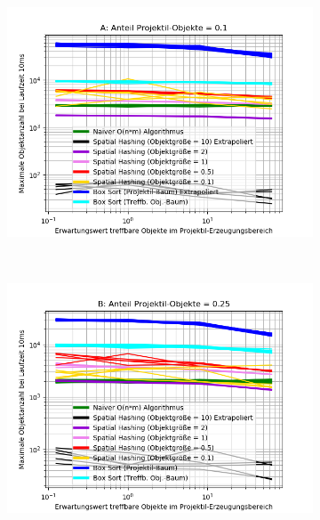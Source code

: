 \begin{figure}
	\begin{subfigure}[t]{0.55\textwidth}
		\centering
		\includegraphics[width=1\textwidth]{./res/shotgunComparison-A.png}
		
		\label{fig:shotgunComparison-A}
	\end{subfigure}
~
	\begin{subfigure}[t]{0.55\textwidth}
		\centering
		\includegraphics[width=1\textwidth]{./res/shotgunComparison-B.png}


\end{subfigure}
\end{figure}
